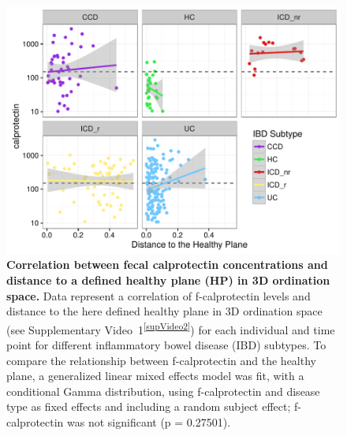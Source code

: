 \begin{figure}[htbp]
\includegraphics[width=\columnwidth]{plane-figures/Fig3}
\caption[Correlation between fecal calprotectin concentrations and distance to a defined healthy plane (HP) in 3D ordination space.]{\textbf{Correlation between fecal calprotectin concentrations and distance to a defined healthy plane (HP) in 3D ordination space.} Data represent a correlation of f-calprotectin levels and distance to the here defined healthy plane in 3D ordination space (see Supplementary Video~1\textsuperscript{\ref{supVideo2}}) for each individual and time point for different inflammatory bowel disease (IBD) subtypes. To compare the relationship between f-calprotectin and the healthy plane, a generalized linear mixed effects model was fit, with a conditional Gamma distribution, using f-calprotectin and disease type as fixed effects and including a random subject effect; f-calprotectin was not significant (p = 0.27501).}
\label{plane-fig3}
\end{figure} 

